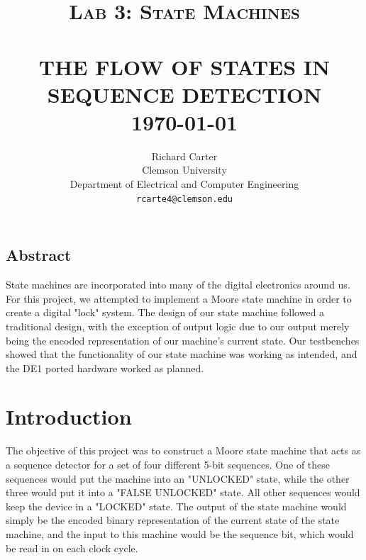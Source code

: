 \documentclass[paper=a4, fontsize=11pt,twoside]{scrartcl}
\title{	\normalsize \textsc{Lab 3: State Machines} 	%
	\\[2.0cm]								%
	\HRule{0.5pt} \\						%
	\LARGE \textbf{\uppercase{The flow of states in Sequence Detection}}	%
	\HRule{2pt} \\ [0.5cm]		%
	\normalsize \today			%
}
\author{
	Richard Carter\\	
	Clemson University\\	
	Department of Electrical and Computer Engineering\\
	\texttt{rcarte4@clemson.edu} \\
}
\makeatletter
\def\printtitle{%
	{\centering \@title\par}}
\def\printauthor{%
	{\centering \large \@author}}
\makeatother
\begin{document}
\thispagestyle{empty}		%

\printtitle					%
\vfill
\printauthor				%
\newpage

\thispagestyle{empty}
\vspace*{\fill}
\begin{center}
\begin{Huge}
\section{Abstract} %
\label{sec:abstract}
\end{Huge}
\end{center}
State machines are incorporated into many of the digital electronics around us. For this project, we attempted to implement a Moore state machine in order to create a digital "lock" system. The design of our state machine followed a traditional design, with the exception of output logic due to our output merely being the encoded representation of our machine's current state. Our testbenches showed that the functionality of our state machine was working as intended, and the DE1 ported hardware worked as planned.

\vspace*{\fill}
\newpage


\setcounter{page}{1}		%
\section{Introduction} %
\label{sec:introduction}
The objective of this project was to construct a Moore state machine that acts as a sequence detector for a set of four different 5-bit sequences. One of these sequences would put the machine into an "UNLOCKED" state, while the other three would put it into a "FALSE UNLOCKED" state. All other sequences would keep the device in a "LOCKED" state. The output of the state machine would simply be the encoded binary representation of the current state of the state machine, and the input to this machine would be the sequence bit, which would be read in on each clock cycle. 
\end{document}
